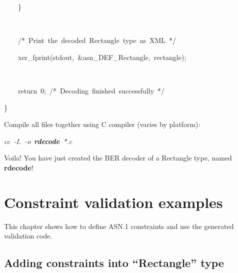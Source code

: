\documentclass[english,oneside,12pt]{book}
\newenvironment{lyxcode}
{\par\begin{list}{}{
\setlength{\rightmargin}{\leftmargin}
\setlength{\listparindent}{0pt}%
\raggedright
\setlength{\itemsep}{0pt}
\setlength{\parsep}{0pt}
\normalfont\ttfamily}%
 \item[]}
{\end{list}}
\begin{document}
\begin{enumerate}
\begin{lyxcode}
{\small{}~~~~\}}{\small \par}

{\small{}~}{\small \par}

{\small{}~~~~/{*}~Print~the~decoded~Rectangle~type~as~XML~{*}/}{\small \par}

{\small{}~~~~xer\_fprint(stdout,~\&asn\_DEF\_Rectangle,~rectangle);}{\small \par}

{\small{}~}{\small \par}

{\small{}~~~~return~0;~/{*}~Decoding~finished~successfully~{*}/}{\small \par}

{\small \}}{\small \par}
\end{lyxcode}
\item Compile all files together using C compiler (varies by platform):

\begin{lyxcode}
\emph{cc~-I.~-o}~\textbf{\emph{rdecode}}~\emph{{*}.c}
\end{lyxcode}
\item Voila! You have just created the BER decoder of a Rectangle type,
named \textbf{rdecode}!
\end{enumerate}

\chapter{Constraint validation examples}

This chapter shows how to define ASN.1 constraints and use the generated
validation code.


\section{Adding constraints into ``Rectangle'' type}
\end{document}
